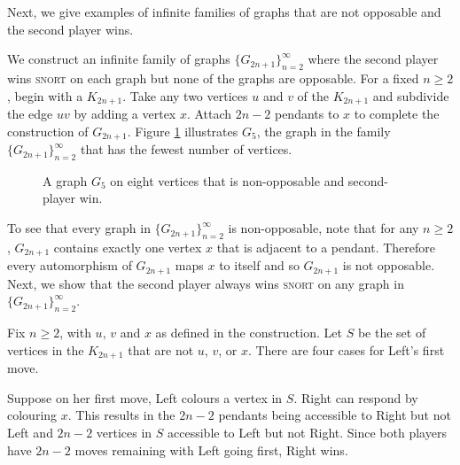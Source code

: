 \documentclass[11pt]{article}
\theoremstyle{definition}
\begin{document}
Next, we give examples of infinite families of graphs that are not opposable
and the second player wins. 

We construct an infinite family of graphs $\{G_{2n+1}\}_{n=2}^\infty$ where the
second player wins \textsc{snort} on each graph but none of the graphs are
opposable. For a fixed $n\geq 2$, begin with a $K_{2n+1}$. Take any two
vertices $u$ and $v$ of the $K_{2n+1}$ and subdivide the edge $uv$ by adding a
vertex $x$. Attach $2n-2$ pendants to $x$ to complete the construction of
$G_{2n+1}$. Figure \ref{fig: Will's infinite construction} illustrates $G_5$,
the graph in the family $\{G_{2n+1}\}_{n=2}^\infty$ that has the fewest number
of vertices.

\begin{figure}
    \centering
    \caption{A graph $G_5$ on eight vertices that is non-opposable and
    second-player win.}
    \label{fig: Will's infinite construction}
\end{figure}

To see that every graph in $\{G_{2n+1}\}_{n=2}^\infty$ is non-opposable, note
that for any $n\geq 2$, $G_{2n+1}$ contains exactly one vertex $x$ that is
adjacent to a pendant. Therefore every automorphism of $G_{2n+1}$ maps $x$ to
itself and so $G_{2n+1}$ is not opposable. Next, we show that the second player
always wins \textsc{snort} on any graph in $\{G_{2n+1}\}_{n=2}^\infty$.

Fix $n\geq 2$, with $u$, $v$ and $x$ as defined in the construction. Let $S$ be
the set of vertices in the $K_{2n+1}$ that are not $u$, $v$, or $x$. There are
four cases for Left's first move.

Suppose on her first move, Left colours a vertex in $S$. Right can respond by
colouring $x$. This results in the $2n-2$ pendants being accessible to Right
but not Left and $2n-2$ vertices in $S$ accessible to Left but not Right. Since
both players have $2n-2$ moves remaining with Left going first, Right wins.
\end{document}
